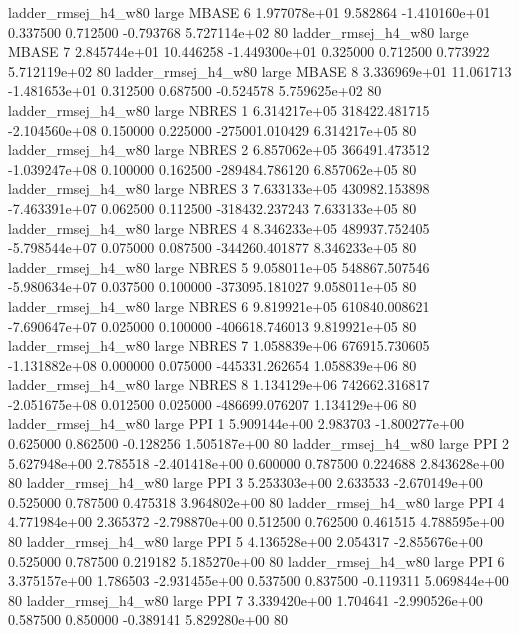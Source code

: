 ladder_rmsej_h4_w80      large    MBASE                 6 1.977078e+01      9.582864 -1.410160e+01 0.337500 0.712500      -0.793768 5.727114e+02 80
ladder_rmsej_h4_w80      large    MBASE                 7 2.845744e+01     10.446258 -1.449300e+01 0.325000 0.712500       0.773922 5.712119e+02 80
ladder_rmsej_h4_w80      large    MBASE                 8 3.336969e+01     11.061713 -1.481653e+01 0.312500 0.687500      -0.524578 5.759625e+02 80
ladder_rmsej_h4_w80      large    NBRES                 1 6.314217e+05 318422.481715 -2.104560e+08 0.150000 0.225000 -275001.010429 6.314217e+05 80
ladder_rmsej_h4_w80      large    NBRES                 2 6.857062e+05 366491.473512 -1.039247e+08 0.100000 0.162500 -289484.786120 6.857062e+05 80
ladder_rmsej_h4_w80      large    NBRES                 3 7.633133e+05 430982.153898 -7.463391e+07 0.062500 0.112500 -318432.237243 7.633133e+05 80
ladder_rmsej_h4_w80      large    NBRES                 4 8.346233e+05 489937.752405 -5.798544e+07 0.075000 0.087500 -344260.401877 8.346233e+05 80
ladder_rmsej_h4_w80      large    NBRES                 5 9.058011e+05 548867.507546 -5.980634e+07 0.037500 0.100000 -373095.181027 9.058011e+05 80
ladder_rmsej_h4_w80      large    NBRES                 6 9.819921e+05 610840.008621 -7.690647e+07 0.025000 0.100000 -406618.746013 9.819921e+05 80
ladder_rmsej_h4_w80      large    NBRES                 7 1.058839e+06 676915.730605 -1.131882e+08 0.000000 0.075000 -445331.262654 1.058839e+06 80
ladder_rmsej_h4_w80      large    NBRES                 8 1.134129e+06 742662.316817 -2.051675e+08 0.012500 0.025000 -486699.076207 1.134129e+06 80
ladder_rmsej_h4_w80      large      PPI                 1 5.909144e+00      2.983703 -1.800277e+00 0.625000 0.862500      -0.128256 1.505187e+00 80
ladder_rmsej_h4_w80      large      PPI                 2 5.627948e+00      2.785518 -2.401418e+00 0.600000 0.787500       0.224688 2.843628e+00 80
ladder_rmsej_h4_w80      large      PPI                 3 5.253303e+00      2.633533 -2.670149e+00 0.525000 0.787500       0.475318 3.964802e+00 80
ladder_rmsej_h4_w80      large      PPI                 4 4.771984e+00      2.365372 -2.798870e+00 0.512500 0.762500       0.461515 4.788595e+00 80
ladder_rmsej_h4_w80      large      PPI                 5 4.136528e+00      2.054317 -2.855676e+00 0.525000 0.787500       0.219182 5.185270e+00 80
ladder_rmsej_h4_w80      large      PPI                 6 3.375157e+00      1.786503 -2.931455e+00 0.537500 0.837500      -0.119311 5.069844e+00 80
ladder_rmsej_h4_w80      large      PPI                 7 3.339420e+00      1.704641 -2.990526e+00 0.587500 0.850000      -0.389141 5.829280e+00 80
